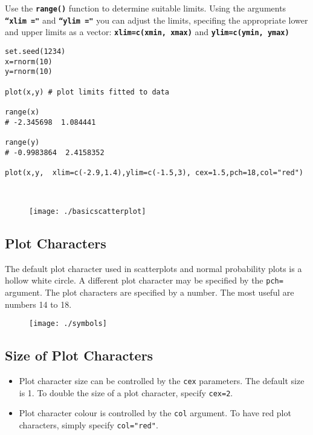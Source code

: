 \noindent Use the \textbf{\texttt{range()}} function to determine suitable limits. Using the arguments \textbf{\texttt{``xlim ="}} and \textbf{\texttt{``ylim ="}} you can adjust the limits, specifing the appropriate lower and upper limits as a vector: \textbf{\texttt{xlim=c(xmin, xmax)}} and \textbf{\texttt{ylim=c(ymin, ymax)}}

\begin{framed}
\begin{verbatim}
set.seed(1234)
x=rnorm(10)
y=rnorm(10)

plot(x,y) # plot limits fitted to data

range(x)
# -2.345698  1.084441

range(y)
# -0.9983864  2.4158352

plot(x,y,  xlim=c(-2.9,1.4),ylim=c(-1.5,3), cex=1.5,pch=18,col="red")



\end{verbatim}
\end{framed}
\begin{figure}[h!]
\centering
\texttt{[image: ./basicscatterplot]}

\end{figure}



\subsection{Plot Characters}
The default plot character used in scatterplots and normal probability plots is a hollow white circle.
A different plot character may be specified by the \texttt{pch=} argument. The plot characters are specified by a number. The most useful are numbers 14 to 18.

\begin{figure}
\centering
\texttt{[image: ./symbols]}
\caption{}
\label{fig:symbols}
\end{figure}
\subsection{Size of Plot Characters}
\begin{itemize}
\item Plot character size can be controlled by the \texttt{cex} parameters. The default size is 1. To double the size of a plot character, specify \texttt{cex=2}.

\item Plot character colour is controlled by the \texttt{col} argument. To have red plot characters, simply specify \texttt{col="red"}.
\end{itemize}

